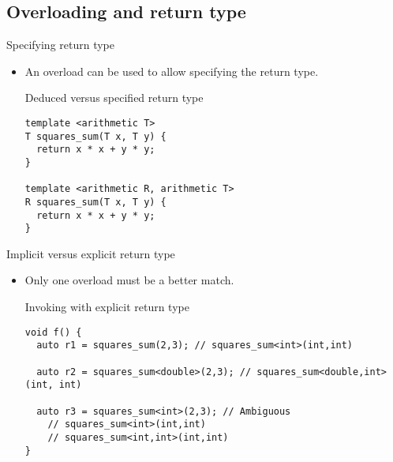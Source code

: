 \subsection{Overloading and return type}

\begin{frame}[t,fragile]{Specifying return type}
\begin{itemize}
  \item An overload can be used to allow specifying the return type.

\begin{block}{Deduced versus specified return type}
\begin{lstlisting}
template <arithmetic T>
T squares_sum(T x, T y) {
  return x * x + y * y;
}

template <arithmetic R, arithmetic T>
R squares_sum(T x, T y) {
  return x * x + y * y;
}
\end{lstlisting}
\end{block}

\end{itemize}
\end{frame}


\begin{frame}[t,fragile]{Implicit versus explicit return type}
\begin{itemize}

  \item Only one overload must be a better match.

\begin{block}{Invoking with explicit return type}
\begin{lstlisting}
void f() {
  auto r1 = squares_sum(2,3); // squares_sum<int>(int,int)

  auto r2 = squares_sum<double>(2,3); // squares_sum<double,int>(int, int)

  auto r3 = squares_sum<int>(2,3); // Ambiguous
    // squares_sum<int>(int,int)
    // squares_sum<int,int>(int,int)
}
\end{lstlisting}
\end{block}

\end{itemize}
\end{frame}
